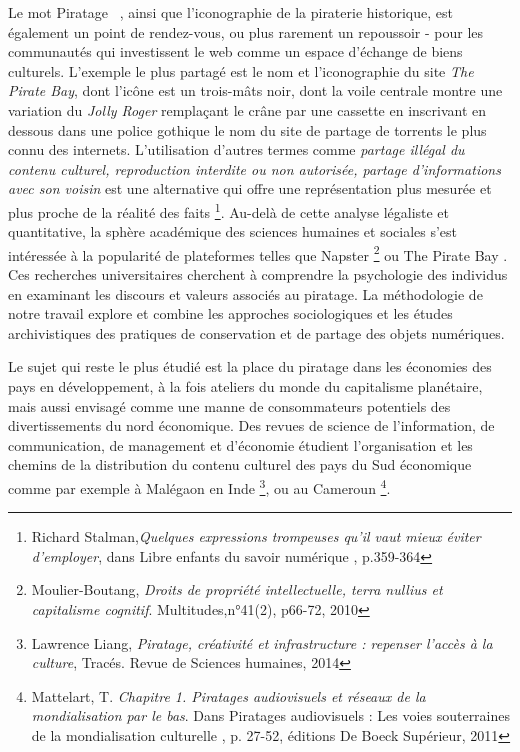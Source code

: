 Le mot \guillemetleft  Piratage \guillemetright~, ainsi que l'iconographie de la piraterie historique, est également un point de rendez-vous, ou plus rarement un repoussoir - pour les communautés qui investissent le web comme un espace d'échange de biens culturels. L'exemple le plus partagé est le nom et l'iconographie du site \textit{The Pirate Bay}, dont l'icône est un trois-mâts noir, dont la voile centrale montre une variation du \textit{Jolly Roger} remplaçant le crâne par une cassette en inscrivant en dessous dans une police gothique le nom du site de partage de torrents le plus connu des internets.  L'utilisation d'autres termes comme \textit{partage illégal du contenu culturel, reproduction interdite ou non autorisée, partage d'informations avec son voisin} est une alternative qui offre une représentation plus mesurée et plus proche de la réalité des faits \footnote{Richard Stalman,\textit{Quelques expressions trompeuses qu'il vaut mieux éviter d'employer}, dans \guillemetleft Libre enfants du savoir numérique \guillemetright, p.359-364 }. Au-delà de cette analyse légaliste et quantitative, la sphère académique des sciences humaines et sociales s'est intéressée à la popularité de plateformes telles que Napster \footnote{Moulier-Boutang, \textit{Droits de propriété intellectuelle, terra nullius et capitalisme cognitif}. Multitudes,n°41(2), p66-72, 2010} ou The Pirate Bay . Ces recherches universitaires cherchent à comprendre la psychologie des individus en examinant les discours et valeurs associés au piratage. La méthodologie de notre travail explore et combine les approches sociologiques et les études archivistiques des pratiques de conservation et de partage des objets numériques. 

Le sujet qui reste le plus étudié est la place du piratage dans les économies des pays en développement, à la fois ateliers du monde du capitalisme planétaire, mais aussi envisagé comme une manne de consommateurs potentiels des divertissements du nord économique. Des revues de science de l'information, de communication, de management et d'économie étudient l'organisation et les chemins de la distribution du contenu culturel des pays du Sud économique comme par exemple à Malégaon en Inde \footnote{Lawrence Liang,\textit{ Piratage, créativité et infrastructure : repenser l’accès à la culture}, Tracés. Revue de Sciences humaines, 2014}, ou au Cameroun \footnote{Mattelart, T.\textit{ Chapitre 1. Piratages audiovisuels et réseaux de la mondialisation par le bas}. Dans \og Piratages audiovisuels : Les voies souterraines de la mondialisation culturelle \fg, p. 27-52, éditions De Boeck Supérieur, 2011}.

